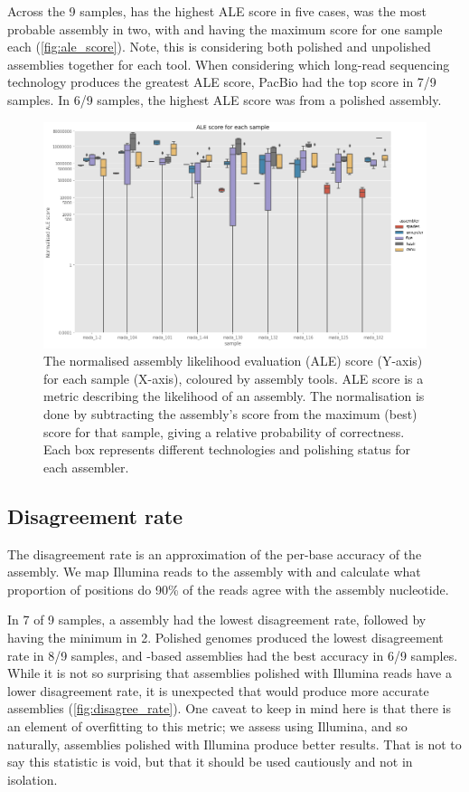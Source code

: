 Across the 9 samples,  has the highest ALE score in five cases,  was the most probable assembly in two, with  and  having the maximum score for one sample each (\autoref{fig:ale_score}). Note, this is considering both polished and unpolished assemblies together for each tool. When considering which long-read sequencing technology produces the greatest ALE score, PacBio had the top score in 7/9 samples. In 6/9 samples, the highest ALE score was from a polished assembly.

\begin{figure}
\includegraphics[width=1.0\textwidth]{Appendix1/Figs/ale_score.png}
\centering
\caption{The normalised assembly likelihood evaluation (ALE) score (Y-axis) for each sample (X-axis), coloured by assembly tools. ALE score is a metric describing the likelihood of an assembly. The normalisation is done by subtracting the assembly's score from the maximum (best) score for that sample, giving a relative probability of correctness. Each box represents different technologies and polishing status for each assembler.}
\label{fig:ale_score}
\end{figure}

\subsection{Disagreement rate}
\label{app:asm_disagree}

The disagreement rate is an approximation of the per-base accuracy of the assembly. We map Illumina reads to the assembly with  and calculate what proportion of positions do 90\% of the reads agree with the assembly nucleotide.  

In 7 of 9 samples, a  assembly had the lowest disagreement rate, followed by  having the minimum in 2. Polished genomes produced the lowest disagreement rate in 8/9 samples, and \ont{}-based assemblies had the best accuracy in 6/9 samples. While it is not so surprising that assemblies polished with Illumina reads have a lower disagreement rate, it is unexpected that \ont{} would produce more accurate assemblies (\autoref{fig:disagree_rate}). One caveat to keep in mind here is that there is an element of overfitting to this metric; we assess using Illumina, and so naturally, assemblies polished with Illumina produce better results. That is not to say this statistic is void, but that it should be used cautiously and not in isolation.

